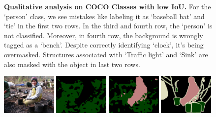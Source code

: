 \begin{figure}[p!]
  \caption[\textbf{Qualitative analysis on COCO Classes with low IoU}]{\textbf{Qualitative analysis on COCO Classes with low IoU.} For the `person' class, we see mistakes like labeling it as `baseball bat' and `tie' in the first two rows. In the third and fourth row, the `person' is not classified. Moreover, in fourth row, the background is wrongly tagged as a `bench'. Despite correctly identifying `clock', it's being overmasked. Structures associated with `Traffic light' and `Sink' are also masked with the object in last two rows.}
  \label{fig:cocobad}
\end{figure}


\begin{figure}[tbhp!]
  \centering
  \hspace{4em}
  \hspace{1.5em}
  \hspace{1.5em}
  \vspace{-0.05em} %
  \vspace{-0.05em}
  
  
  {\includegraphics[width=0.24\textwidth]{figures/experiments/pascal/image/0072.jpg}}
  {\includegraphics[width=0.24\textwidth]{figures/experiments/pascal/orgckpt/0072.png}}
  {\includegraphics[width=0.24\textwidth]{figures/experiments/pascal/nonnoisybaseline/0072.png}}
  {\includegraphics[width=0.24\textwidth]{figures/experiments/pascal/gt/2007_002378.png}}
  

\end{figure}
